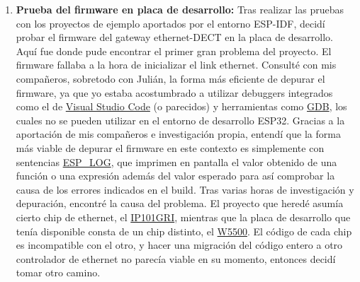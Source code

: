 \documentclass[a4paper,11pt]{article}
\begin{document}
\begin{itemize}
\begin{enumerate}
		\item \textbf{Prueba del firmware en placa de desarrollo: } Tras realizar las pruebas con los proyectos de ejemplo aportados por el entorno ESP-IDF, decidí probar el firmware del gateway ethernet-DECT en la placa de desarrollo. Aquí fue donde pude encontrar el primer gran problema del proyecto. El firmware fallaba a la hora de inicializar el link ethernet. Consulté con mis compañeros, sobretodo con Julián, la forma más eficiente de depurar el firmware, ya que yo estaba acostumbrado a utilizar debuggers integrados como el de \href{https://code.visualstudio.com/docs/debugtest/debugging}{Visual Studio Code} (o parecidos) y herramientas como \href{https://sourceware.org/gdb/}{GDB}, los cuales no se pueden utilizar en el entorno de desarrollo ESP32. Gracias a la aportación de mis compañeros e investigación propia, entendí que la forma más viable de depurar el firmware en este contexto es simplemente con sentencias \href{https://docs.espressif.com/projects/esp-idf/en/stable/esp32/api-reference/system/log.html#_CPPv47esp_log16esp_log_config_tPKcPKcz}{ESP\_LOG}, que imprimen en pantalla el valor obtenido de una función o una expresión además del valor esperado para así comprobar la causa de los errores indicados en el build. Tras varias horas de investigación y depuración, encontré la causa del problema. El proyecto que heredé asumía cierto chip de ethernet, el \href{https://www.lcsc.com/datasheet/C703537.pdf?spm=wm.sxq.inf.ggs&lcsc_vid=RlVdUlUEQVNXX1RRRQNaUlxeEwReBgJQQVNaAl1TRFExVlNeRVVZVlNUT1JYVTsOAxUeFF5JWAUbBA8CAgIFAAtIFA4DSA%3D%3D}{IP101GRI}, mientras que la placa de desarrollo que tenía disponible consta de un chip distinto, el \href{https://docs.wiznet.io/img/products/w5500/W5500_ds_v110e.pdf}{W5500}. El código de cada chip es incompatible con el otro, y hacer una migración del código entero a otro controlador de ethernet no parecía viable en su momento, entonces decidí tomar otro camino.

\end{enumerate}
\end{itemize}
\end{document}
